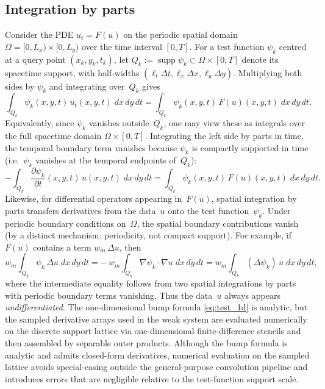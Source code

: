 \subsection{Integration by parts}
\label{subsec:ibp}

Consider the PDE $u_t = F(u)$ on the periodic spatial domain
$\Omega=[0,L_x)\times[0,L_y)$ over the time interval
$[0,T]$.  For a test function $\psi_k$ centred at a query point
$(x_k,y_k,t_k)$, let $Q_k := \operatorname{supp}\psi_k
\subset \Omega\times[0,T]$ denote its spacetime support, with
half-widths $(\ell_t\Delta t,\ell_x\Delta x,\ell_y\Delta y)$.
Multiplying both sides
by $\psi_k$ and integrating over~$Q_k$ gives
\[
  \int_{Q_k} \psi_k(x,y,t)\,u_t(x,y,t)\;dx\,dy\,dt
  = \int_{Q_k} \psi_k(x,y,t)\,F(u)(x,y,t)\;dx\,dy\,dt.
\]
Equivalently, since $\psi_k$ vanishes outside~$Q_k$, one may view these as
integrals over the full spacetime domain $\Omega\times[0,T]$.  Integrating
the left side by parts in time, the temporal boundary term vanishes because
$\psi_k$ is compactly supported in time (i.e.\ $\psi_k$ vanishes at the
temporal endpoints of~$Q_k$):
\begin{equation}
  -\int_{Q_k} \frac{\partial\psi_k}{\partial t}(x,y,t)\,u(x,y,t)\;dx\,dy\,dt
  = \int_{Q_k} \psi_k(x,y,t)\,F(u)(x,y,t)\;dx\,dy\,dt.
  \label{eq:ibp_temporal}
\end{equation}
Likewise, for differential operators appearing in~$F(u)$, spatial
integration by parts transfers derivatives from the data~$u$ onto the test
function~$\psi_k$.  Under periodic boundary conditions on~$\Omega$, the
spatial boundary contributions vanish (by a distinct mechanism: periodicity,
not compact support).  For example, if $F(u)$ contains a
term $w_m\,\Delta u$, then
\[
  w_m\int_{Q_k}\psi_k\,\Delta u\;dx\,dy\,dt
  = -\,w_m\int_{Q_k}\nabla\psi_k\cdot\nabla u\;dx\,dy\,dt
  = w_m\int_{Q_k}(\Delta\psi_k)\,u\;dx\,dy\,dt,
\]
where the intermediate equality follows from two spatial integrations by
parts with periodic boundary terms vanishing.  Thus the data~$u$ always appears
\emph{undifferentiated}.  The one-dimensional bump formula
\eqref{eq:test_1d} is analytic, but the sampled derivative arrays used in
the weak system are evaluated numerically on the discrete support lattice
via one-dimensional finite-difference stencils and then assembled by
separable outer products.
Although the bump formula is analytic and admits closed-form derivatives,
numerical evaluation on the sampled lattice avoids special-casing outside
the general-purpose convolution pipeline and introduces errors that are
negligible relative to the test-function support scale.

